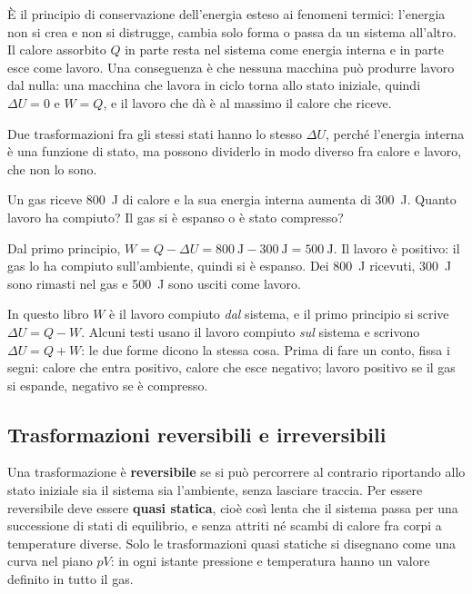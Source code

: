 È il principio di conservazione dell'energia esteso ai fenomeni termici: l'energia non si crea e non si distrugge, cambia solo forma o passa da un sistema all'altro. Il calore assorbito $Q$ in parte resta nel sistema come energia interna e in parte esce come lavoro. Una conseguenza è che nessuna macchina può produrre lavoro dal nulla: una macchina che lavora in ciclo torna allo stato iniziale, quindi $\Delta U = 0$ e $W = Q$, e il lavoro che dà è al massimo il calore che riceve.

Due trasformazioni fra gli stessi stati hanno lo stesso $\Delta U$, perché l'energia interna è una funzione di stato, ma possono dividerlo in modo diverso fra calore e lavoro, che non lo sono.

\begin{esempio}
Un gas riceve \SI{800}{\joule} di calore e la sua energia interna aumenta di \SI{300}{\joule}. Quanto lavoro ha compiuto? Il gas si è espanso o è stato compresso?

Dal primo principio, $W = Q - \Delta U = \SI{800}{\joule} - \SI{300}{\joule} = \SI{500}{\joule}$. Il lavoro è positivo: il gas lo ha compiuto sull'ambiente, quindi si è espanso. Dei \SI{800}{\joule} ricevuti, \SI{300}{\joule} sono rimasti nel gas e \SI{500}{\joule} sono usciti come lavoro.
\end{esempio}

\begin{attenzione}
In questo libro $W$ è il lavoro compiuto \emph{dal} sistema, e il primo principio si scrive $\Delta U = Q - W$. Alcuni testi usano il lavoro compiuto \emph{sul} sistema e scrivono $\Delta U = Q + W$: le due forme dicono la stessa cosa. Prima di fare un conto, fissa i segni: calore che entra positivo, calore che esce negativo; lavoro positivo se il gas si espande, negativo se è compresso.
\end{attenzione}



\subsection{Trasformazioni reversibili e irreversibili}

Una trasformazione è \textbf{reversibile} se si può percorrere al contrario riportando allo stato iniziale sia il sistema sia l'ambiente, senza lasciare traccia. Per essere reversibile deve essere \textbf{quasi statica}, cioè così lenta che il sistema passa per una successione di stati di equilibrio, e senza attriti né scambi di calore fra corpi a temperature diverse. Solo le trasformazioni quasi statiche si disegnano come una curva nel piano $pV$: in ogni istante pressione e temperatura hanno un valore definito in tutto il gas.

